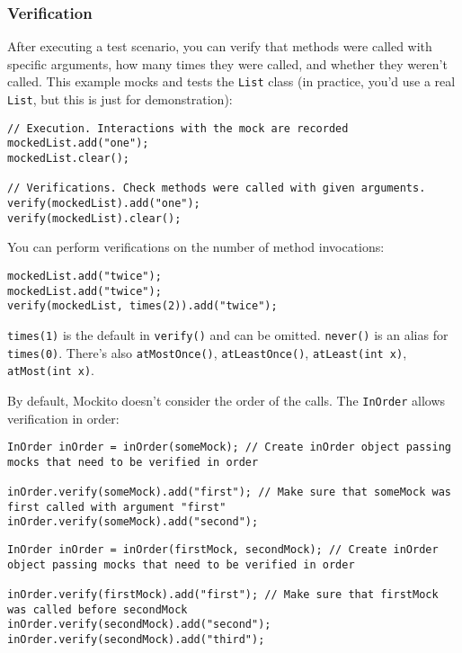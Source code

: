 \documentclass[8pt, table, xcdraw]{article}%
\begin{document}
\subsubsection{Verification}

After executing a test scenario, you can verify that methods were called with specific arguments, how many times they were called, and whether they weren't called. This example mocks and tests the \lstinline{List} class (in practice, you'd use a real \lstinline{List}, but this is just for demonstration):

\begin{lstlisting}
// Execution. Interactions with the mock are recorded
mockedList.add("one");
mockedList.clear();

// Verifications. Check methods were called with given arguments.
verify(mockedList).add("one");
verify(mockedList).clear();
\end{lstlisting}

You can perform verifications on the number of method invocations:

\begin{lstlisting}
mockedList.add("twice");
mockedList.add("twice");
verify(mockedList, times(2)).add("twice");
\end{lstlisting}

\lstinline{times(1)} is the default in \lstinline{verify()} and can be omitted. \lstinline{never()} is an alias for \lstinline{times(0)}. There's also \lstinline{atMostOnce()}, \lstinline{atLeastOnce()}, \lstinline{atLeast(int x)}, \lstinline{atMost(int x)}.

By default, Mockito doesn't consider the order of the calls. The \lstinline{InOrder} allows verification in order:

\begin{lstlisting}
InOrder inOrder = inOrder(someMock); // Create inOrder object passing mocks that need to be verified in order

inOrder.verify(someMock).add("first"); // Make sure that someMock was first called with argument "first"
inOrder.verify(someMock).add("second");
\end{lstlisting}

\begin{lstlisting}
InOrder inOrder = inOrder(firstMock, secondMock); // Create inOrder object passing mocks that need to be verified in order

inOrder.verify(firstMock).add("first"); // Make sure that firstMock was called before secondMock
inOrder.verify(secondMock).add("second");
inOrder.verify(secondMock).add("third");
\end{lstlisting}
\end{document}
